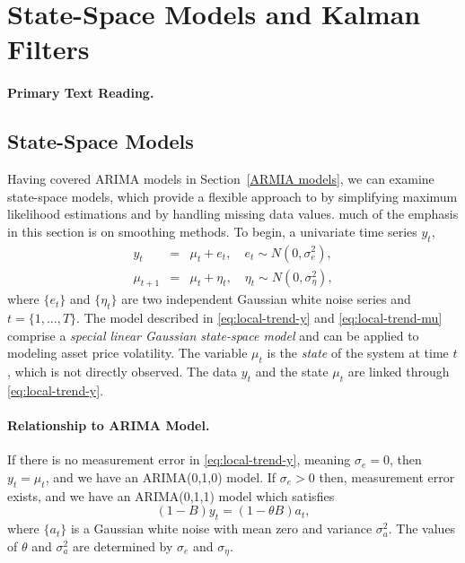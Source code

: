 \section{State-Space Models and Kalman Filters}
\paragraph{Primary Text Reading.} 

\subsection{State-Space Models}
Having covered ARIMA models in Section~\ref{ARMIA models}, we can examine state-space models, which provide a flexible approach to \fts{} by simplifying maximum likelihood estimations and by handling missing data values. much of the emphasis in this section is on smoothing methods. To begin, a univariate time series $y_t$,
\begin{eqnarray}
y_t &=& \mu_t + e_t, \quad e_t \sim N(0,\sigma^2_e), \label{eq:local-trend-y} \\
\mu_{t+1} &=& \mu_t + \eta_t, \quad \eta_t \sim N(0,\sigma^2_{\eta}), \label{eq:local-trend-mu}
\end{eqnarray}
where $\{e_t\}$ and $\{\eta_t\}$ are two independent Gaussian white noise series and $t=\{1, \ldots, T\}$. The model described in \eqref{eq:local-trend-y} and \eqref{eq:local-trend-mu} comprise a \emph{special linear Gaussian state-space model} and can be applied to modeling asset price volatility. The variable $\mu_t$ is the \emph{state} of the system at time $t$, which is not directly observed. The data $y_t$ and the state $\mu_t$ are linked through \eqref{eq:local-trend-y}.

\paragraph{Relationship to ARIMA Model.} If there is no measurement error in \eqref{eq:local-trend-y}, meaning $\sigma_e=0$, then $y_t=\mu_t$, and we have an ARIMA(0,1,0) model. If $\sigma_e >0$ then, measurement error exists, and we have an ARIMA(0,1,1) model which satisfies
\[
(1-B)y_t = (1-\theta B)a_t,
\]
where $\{a_t\}$ is a Gaussian white noise with mean zero and variance $\sigma^2_a$. The values of $\theta$ and $\sigma^2_a$ are determined by $\sigma_e$ and $\sigma_{\eta}$.

